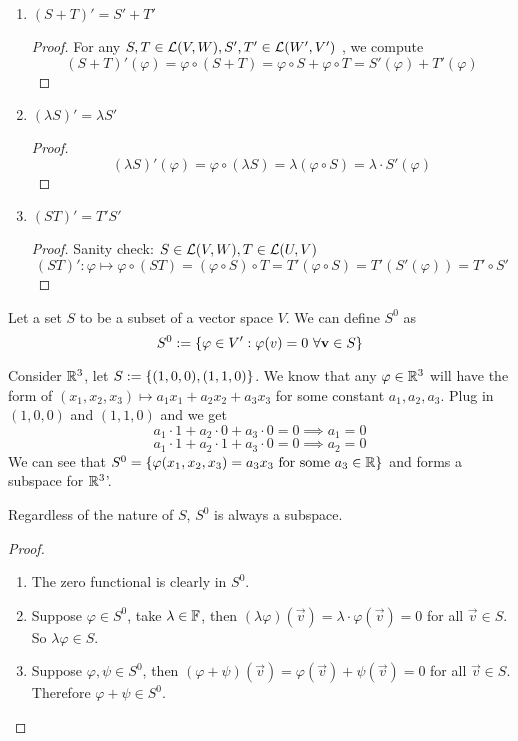 \begin{remark} $ $
    \vspace{-0.5cm}
    \begin{enumerate}
        \item $(S + T)'  = S' + T'$
        \begin{proof}
            For any $S,T \in \mathcal L(V,W), S', T' \in \mathcal L(W',V')$ , we compute 
            \[(S + T)'(\varphi) = \varphi \circ (S + T) = \varphi \circ S + \varphi \circ T = S'(\varphi) + T'(\varphi)\]
        \end{proof}
        \item $(\lambda S)' = \lambda S'$
        \begin{proof}
            \[ (\lambda S)'(\varphi) = \varphi \circ (\lambda S) = \lambda (\varphi \circ S) = \lambda \cdot S'(\varphi)\]
        \end{proof}
        \item $(ST)'  = T' S'$
        \begin{proof}
            Sanity check: $S \in \mathcal L(V,W), T \in \mathcal L(U,V)$
            \[ (ST)' : \varphi \mapsto \varphi 
            \circ (ST) = (\varphi \circ S) \circ T = T'(\varphi \circ S) = T'(S'(\varphi)) = T' \circ S'\]
        \end{proof}
    \end{enumerate}
\end{remark}
\begin{definition}[Annihilators]
    Let a set $S$ to be a subset of a vector space $V$. We can define $S^0$ as 
    \[ S^0 := \left\{ \varphi \in V' : \varphi (v) = 0 \ \forall \mathbf v \in S \right\}\]
\end{definition}
\begin{example}
    Consider $\mathbb R^3$, let $S := \left\{ (1,0,0), (1,1,0) \right\}$. We know that any $\varphi \in \mathbb R^3$ will have the form of $(x_1,x_2,x_3) \mapsto a_1x_1 + a_2x_2 + a_3x_3$ for some constant $a_1,a_2,a_3$. Plug in $(1,0,0)$ and $(1,1,0)$ and we get 
    \[ a_1 \cdot 1 + a_2 \cdot 0 + a_3 \cdot 0 = 0 \implies a_1 = 0\]
    \[ a_1 \cdot 1 + a_2 \cdot 1 + a_3 \cdot 0 = 0 \implies a_2 = 0\]
    We can see that $S^{0} = \left\{ \varphi(x_1, x_2, x_3) = a_3 x_3 \text{ for some } a_3 \in \mathbb R \right\}$ and forms a subspace for $\mathbb R^{3}$'.
\end{example}
\begin{lemma}
    Regardless of the nature of $S$, $S^0$ is always a subspace.
\end{lemma}
\newpage
\begin{proof}
    \begin{enumerate}
        \item The zero functional is clearly in $S^0$.
        \item Suppose $\varphi \in S^0$, take $\lambda \in \mathbb F$, then $(\lambda \varphi)(\vec v) = \lambda \cdot \varphi(\vec v) = 0$ for all $\vec v \in S$. So $\lambda \varphi \in S$.
        \item Suppose $\varphi, \psi \in S^0$, then $(\varphi + \psi)(\vec v) = \varphi(\vec v) + \psi(\vec v) = 0$ for all $\vec v \in S$. Therefore $\varphi + \psi \in S^0$.
    \end{enumerate}
\end{proof}
